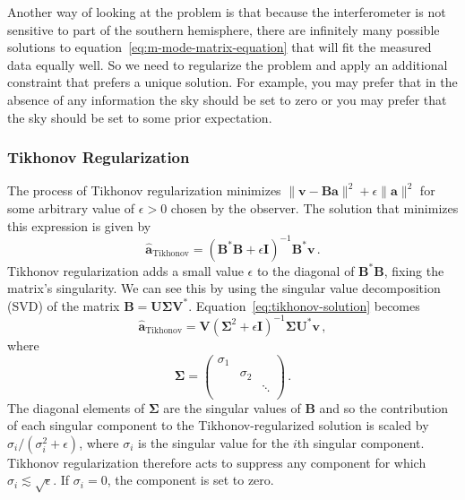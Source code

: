 \documentclass[twocolumn]{aastex6}
\renewcommand{\b}{\pmb}
\newcommand{\atikh}{\b{\hat a}_\text{Tikhonov}}
\begin{document}
Another way of looking at the problem is that because the interferometer is not sensitive to part of
the southern hemisphere, there are infinitely many possible solutions to
equation~\ref{eq:m-mode-matrix-equation} that will fit the measured data equally well. So we need to
regularize the problem and apply an additional constraint that prefers a unique solution. For
example, you may prefer that in the absence of any information the sky should be set to zero or you
may prefer that the sky should be set to some prior expectation.

\subsubsection{Tikhonov Regularization}

The process of Tikhonov regularization minimizes $\|\b v - \b B\b a\|^2 + \epsilon\|\b a\|^2$ for
some arbitrary value of $\epsilon > 0$ chosen by the observer. The solution that minimizes this
expression is given by
\begin{equation}\label{eq:tikhonov-solution}
    \atikh = (\b B^*\b B + \epsilon\b I)^{-1}\b B^*\b v\,.
\end{equation}
Tikhonov regularization adds a small value $\epsilon$ to the diagonal of $\b B^*\b B$, fixing the
matrix's singularity. We can see this by using the singular value decomposition (SVD) of the matrix
$\b B = \b U \b \Sigma \b V^*$. Equation~\ref{eq:tikhonov-solution} becomes
\begin{equation}
    \atikh = \b V (\b\Sigma^2 + \epsilon \b I)^{-1}\b\Sigma \b U^*\b v\,,
\end{equation}
where
\[
    \b\Sigma = \left(
        \begin{array}{ccc}
            \sigma_1 & & \\
                     & \sigma_2 & \\
                     & & \ddots \\
        \end{array}
    \right)\,.
\]
The diagonal elements of $\b\Sigma$ are the singular values of $\b B$ and so the contribution of
each singular component to the Tikhonov-regularized solution is scaled by $\sigma_i / (\sigma_i^2 +
\epsilon)$, where $\sigma_i$ is the singular value for the $i$th singular component. Tikhonov
regularization therefore acts to suppress any component for which $\sigma_i\lesssim\sqrt{\epsilon}$.
If $\sigma_i = 0$, the component is set to zero.
\end{document}
